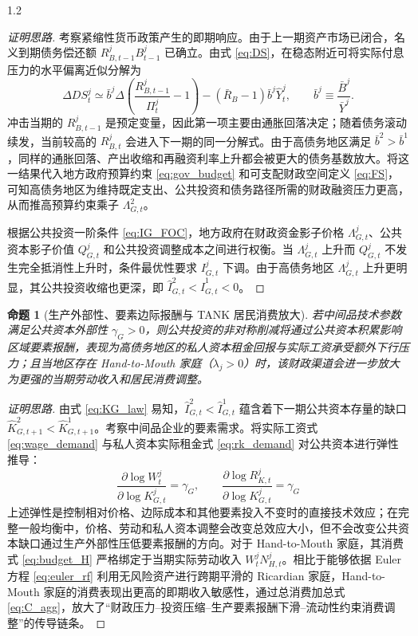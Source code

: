 \documentclass[12pt,UTF8]{ctexart}
\newtheorem{proposition}{命题}
\begin{document}
\begin{spacing}{1.2}
		\begin{proof}[证明思路]
			考察紧缩性货币政策产生的即期响应。由于上一期资产市场已闭合，名义到期债务偿还额 $R_{B,t-1}^jB_{t-1}^j$ 已确立。由式 \eqref{eq:DS}，在稳态附近可将实际付息压力的水平偏离近似分解为
			\begin{equation}
				\Delta DS_t^j
				\simeq
				\bar b^j\Delta\left(\frac{R_{B,t-1}^j}{\Pi_t^j}-1\right)
				-\left(\bar R_B-1\right)\bar b^j\widehat Y_t^j,
				\qquad
				\bar b^j\equiv\frac{\bar B^j}{\bar Y^j}.
			\end{equation}
			冲击当期的 $R_{B,t-1}^j$ 是预定变量，因此第一项主要由通胀回落决定；随着债务滚动续发，当前较高的 $R_{B,t}^j$ 会进入下一期的同一分解式。由于高债务地区满足 $\bar b^2>\bar b^1$，同样的通胀回落、产出收缩和再融资利率上升都会被更大的债务基数放大。将这一结果代入地方政府预算约束 \eqref{eq:gov_budget} 和可支配财政空间定义 \eqref{eq:FS}，可知高债务地区为维持既定支出、公共投资和债务路径所需的财政融资压力更高，从而推高预算约束乘子 $\Lambda_{G,t}^2$。
			
			根据公共投资一阶条件 \eqref{eq:IG_FOC}，地方政府在财政资金影子价格 $\Lambda_{G,t}^j$、公共资本影子价值 $Q_{G,t}^j$ 和公共投资调整成本之间进行权衡。当 $\Lambda_{G,t}^j$ 上升而 $Q_{G,t}^j$ 不发生完全抵消性上升时，条件最优性要求 $I_{G,t}^j$ 下调。由于高债务地区 $\Lambda_{G,t}^j$ 上升更明显，其公共投资收缩也更深，即 $\hat I_{G,t}^2<\hat I_{G,t}^1<0$。
		\end{proof}
		
		\begin{proposition}[生产外部性、要素边际报酬与 TANK 居民消费放大] \label{prop2}
			若中间品技术参数满足公共资本外部性 $\gamma_G > 0$，则公共投资的非对称削减将通过公共资本积累影响区域要素报酬，表现为高债务地区的私人资本租金回报与实际工资承受额外下行压力；且当地区存在 Hand-to-Mouth 家庭（$\lambda_j > 0$）时，该财政渠道会进一步放大为更强的当期劳动收入和居民消费调整。
		\end{proposition}
		
		\begin{proof}[证明思路]
			由式 \eqref{eq:KG_law} 易知，$\hat{I}_{G,t}^2 < \hat{I}_{G,t}^1$ 蕴含着下一期公共资本存量的缺口 $\hat{K}_{G,t+1}^2 < \hat{K}_{G,t+1}^1$。考察中间品企业的要素需求。将实际工资式 \eqref{eq:wage_demand} 与私人资本实际租金式 \eqref{eq:rk_demand} 对公共资本进行弹性推导：
			\begin{equation}
				\frac{\partial \log W_t^j}{\partial \log K_{G,t}^j} = \gamma_G, \qquad \frac{\partial \log R_{K,t}^j}{\partial \log K_{G,t}^j} = \gamma_G
			\end{equation}
			上述弹性是控制相对价格、边际成本和其他要素投入不变时的直接技术效应；在完整一般均衡中，价格、劳动和私人资本调整会改变总效应大小，但不会改变公共资本缺口通过生产外部性压低要素报酬的方向。对于 Hand-to-Mouth 家庭，其消费式 \eqref{eq:budget_H} 严格绑定于当期实际劳动收入 $W_t^j N_{H,t}^j$。相比于能够依据 Euler 方程 \eqref{eq:euler_rf} 利用无风险资产进行跨期平滑的 Ricardian 家庭，Hand-to-Mouth 家庭的消费表现出更高的即期收入敏感性，通过总消费加总式 \eqref{eq:C_agg}，放大了“财政压力--投资压缩--生产要素报酬下滑--流动性约束消费调整”的传导链条。
		\end{proof}
		

\end{spacing}
\end{document}
